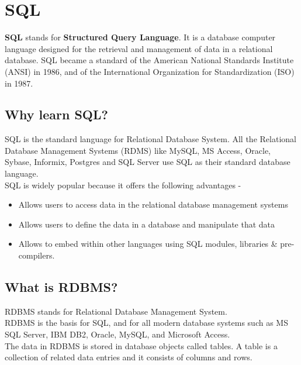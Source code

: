 \section*{SQL}

 \textbf{SQL} stands for \textbf{Structured Query Language}. It is a database computer language designed for the retrieval and management of data in a relational database. SQL became a standard of the American National Standards Institute (ANSI) in 1986, and of the International Organization for Standardization (ISO) in 1987.
 
 
 \subsection*{{Why learn SQL?}}
 SQL is the standard language for Relational Database System. All the Relational Database Management Systems (RDMS) like MySQL, MS Access, Oracle, Sybase, Informix, Postgres and SQL Server use SQL as their standard database language.\\
 SQL is widely popular because it offers the following advantages {-}
 \begin{itemize}
     \item Allows users to access data in the relational database management systems
     \item Allows users to define the data in a database and manipulate that data
     \item Allows to embed within other languages using SQL modules, libraries \& pre{-}compilers.
 \end{itemize}
 
 
 \subsection*{{What is RDBMS?}}
 RDBMS stands for Relational Database Management System.\\
 RDBMS is the basis for SQL, and for all modern database systems such as MS SQL Server, IBM DB2, Oracle, MySQL, and Microsoft Access.\\
 The data in RDBMS is stored in database objects called tables. A table is a collection of related data entries and it consists of columns and rows.
 
 
